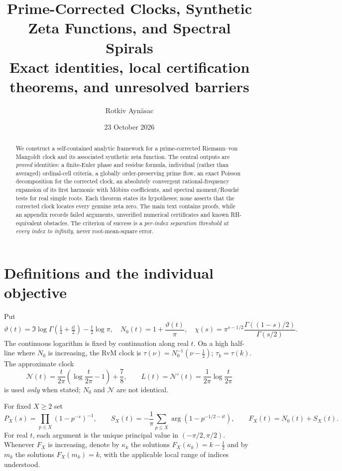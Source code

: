 \documentclass[11pt,a4paper]{article}
\title{\vspace{-12mm}\textbf{Prime-Corrected Clocks, Synthetic Zeta Functions, and Spectral Spirals}\\[3pt]\large Exact identities, local certification theorems, and unresolved barriers}
\author{Rotkiv Ayn\"asac}
\date{23 October 2026}
\numberwithin{equation}{section}
\begin{document}
\maketitle
\begin{abstract}
We construct a self-contained analytic framework for a prime-corrected Riemann--von Mangoldt clock and its associated synthetic zeta function. The central outputs are \emph{proved} identities: a finite-Euler phase and residue formula, individual (rather than averaged) ordinal-cell criteria, a globally order-preserving prime flow, an exact Poisson decomposition for the corrected clock, an absolutely convergent rational-frequency expansion of its first harmonic with M\"obius coefficients, and spectral moment/Rouch\'e tests for real simple roots. Each theorem states its hypotheses; none asserts that the corrected clock locates every genuine zeta zero. The main text contains proofs, while an appendix records failed arguments, unverified numerical certificates and known RH-equivalent obstacles. The criterion of success is a \emph{per-index separation threshold at every index to infinity}, never root-mean-square error.
\end{abstract}
\tableofcontents
\section{Definitions and the individual objective}
Put
\begin{equation}\label{eq:theta}
\vartheta(t)=\Im\log\Gamma\!\left(\tfrac14+\tfrac{it}{2}\right)-\tfrac t2\log\pi,
\quad N_0(t)=1+\frac{\vartheta(t)}\pi,
\quad\chi(s)=\pi^{s-1/2}\frac{\Gamma((1-s)/2)}{\Gamma(s/2)}.
\end{equation}
The continuous logarithm is fixed by continuation along real $t$. On a high half-line where $N_0$ is increasing, the RvM clock is $\tau(\nu)=N_0^{-1}(\nu-\tfrac12)$; $\tau_k=\tau(k)$. The approximate clock
\begin{equation}\label{eq:lead-clock}
\mathcal N(t)=\frac{t}{2\pi}\left(\log\frac{t}{2\pi}-1\right)+\frac78,
\qquad L(t)=\mathcal N'(t)=\frac1{2\pi}\log\frac{t}{2\pi}
\end{equation}
is used \emph{only} when stated; $N_0$ and $\mathcal N$ are not identical.

For fixed $X\ge2$ set
\begin{equation}\label{eq:P-S}
P_X(s)=\prod_{p\le X}(1-p^{-s})^{-1},\qquad
S_X(t)=-\frac1\pi\sum_{p\le X}\arg(1-p^{-1/2-it}),\qquad F_X(t)=N_0(t)+S_X(t).
\end{equation}
For real $t$, each argument is the unique principal value in $(-\pi/2,\pi/2)$. Whenever $F_X$ is increasing, denote by $\kappa_k$ the solutions $F_X(\kappa_k)=k-\tfrac12$ and by $m_k$ the solutions $F_X(m_k)=k$, with the applicable local range of indices understood.
\end{document}
